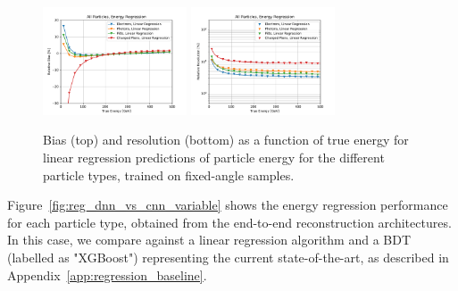 \begin{figure}[htbp]
\centering
\includegraphics[width=0.38\textwidth]{Images/Calo/bias_vs_E_allparts_linreg.pdf}
\includegraphics[width=0.38\textwidth]{Images/Calo/res_vs_E_allparts_linreg_fits.pdf}
\caption{Bias (top) and resolution (bottom) as a function of true energy for linear regression predictions of particle energy for the different particle types, trained on fixed-angle samples. \label{fig:reg_linreg}}
\end{figure}






Figure~\ref{fig:reg_dnn_vs_cnn_variable} shows the energy regression performance for each particle type, obtained from the end-to-end reconstruction architectures. In this case, we compare against a linear regression algorithm and a BDT (labelled as "XGBoost") representing the current state-of-the-art, as described in Appendix~\ref{app:regression_baseline}. 

